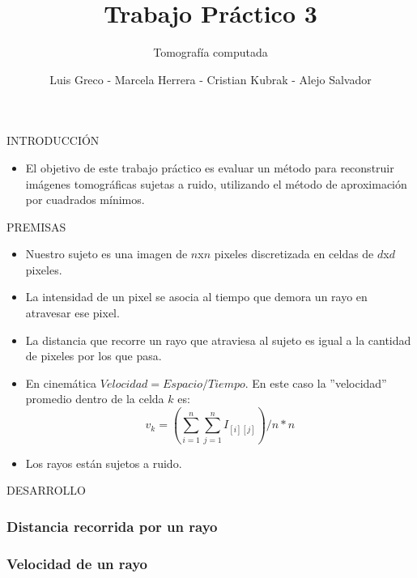 \documentclass[11pt]{beamer}
\author{Luis Greco - Marcela Herrera - Cristian Kubrak - Alejo Salvador }
\title{Trabajo Práctico 3}
\subtitle{Tomografía computada}
\begin{document}
\begin{frame}
\titlepage 
\end{frame}


\begin{frame}{INTRODUCCIÓN}
\begin{itemize}
\item El objetivo de este trabajo práctico es evaluar un método para reconstruir imágenes tomográficas sujetas a ruido, utilizando el método de aproximación por cuadrados mínimos.
\end{itemize}
\end{frame}

\begin{frame}{PREMISAS}
\begin{itemize}
\item Nuestro sujeto es una imagen de $n$x$n$ pixeles discretizada en celdas de $d$x$d$ pixeles.
\item La intensidad de un pixel se asocia al tiempo que demora un rayo en atravesar ese pixel.
\item La distancia que recorre un rayo que atraviesa al sujeto es igual a la cantidad de pixeles por los que pasa.
\item En cinemática $Velocidad = Espacio/Tiempo$. En este caso la ''velocidad'' promedio dentro de la celda $k$ es:
\begin{displaymath}
v_{k} =(\sum_{i=1}^{n}\sum_{j=1}^{n} I_{[i][j]})/n*n
\end{displaymath}
\item Los rayos están sujetos a ruido.
\end{itemize}
\end{frame}


\begin{frame}{DESARROLLO}
\frametitle{Distancia recorrida por un rayo}
\end{frame}

\begin{frame}
\frametitle{Velocidad de un rayo}
\end{frame}
\end{document}
